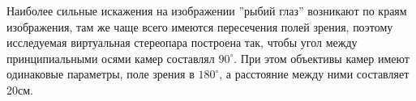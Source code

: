 Наиболее сильные искажения на изображении ''рыбий глаз'' возникают по краям изображения, там же чаще всего имеются пересечения полей зрения,
 поэтому исследуемая виртуальная стереопара построена так, чтобы угол между принципиальными осями камер составлял $90^\circ$. При этом объективы 
 камер имеют одинаковые параметры, поле зрения в $180^\circ$, а расстояние между ними составляет 20см. %



\vspace{\baselineskip}
